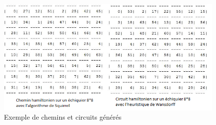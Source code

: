 \begin{figure}[h]
\begin{center}
   \includegraphics[scale=0.6]{img/exempleimpression.png} 
   \caption{\label{ExempleImpression} Exemple de chemins et circuits générés}
   \end{center}
\end{figure}